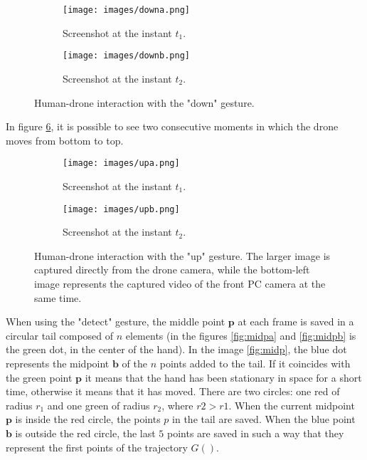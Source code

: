 \begin{figure}[H]
    \centering
    \begin{subfigure}[b]{0.49 \textwidth}
        \centering
        \texttt{[image: images/downa.png]}
        \caption[]{Screenshot at the instant $t_1$.}
        \label{fig:downa}
    \end{subfigure}
    \hfill
    \begin{subfigure}[b]{0.49 \textwidth}
        \centering
        \texttt{[image: images/downb.png]}
        \caption[]{Screenshot at the instant $t_2$.}
        \label{fig:downb}
    \end{subfigure}
    \caption[Human-drone interaction with the "down" gesture.]{Human-drone interaction with the "down" gesture.}
    \label{fig:down}
\end{figure}

\noindent In figure \ref{fig:up}, it is possible to see two consecutive moments in which the drone moves from bottom to top.

\begin{figure}[H]
    \centering
    \begin{subfigure}[b]{0.7 \textwidth}
        \centering
        \texttt{[image: images/upa.png]}
        \caption[]{Screenshot at the instant $t_1$.}
        \label{fig:upa}
    \end{subfigure}
    \hfill
    \begin{subfigure}[b]{0.7 \textwidth}
        \centering
        \texttt{[image: images/upb.png]}
        \caption[]{Screenshot at the instant $t_2$.}
        \label{fig:upb}
    \end{subfigure}
    \caption[Human-drone interaction with the "up" gesture.]{Human-drone interaction with the "up" gesture. The larger image is captured directly from the drone camera, while the bottom-left image represents the captured video of the front PC camera at the same time.}
    \label{fig:up}
\end{figure}

\noindent When using the "detect" gesture, the middle point $\bm{p}$ at each frame is saved in a circular tail composed of $n$ elements (in the figures \ref{fig:midpa} and \ref{fig:midpb} is the green dot, in the center of the hand). In the image \ref{fig:midp}, the blue dot represents the midpoint $\bm{b}$ of the $n$ points added to the tail. If it coincides with the green point $\bm{p}$ it means that the hand has been stationary in space for a short time, otherwise it means that it has moved. There are two circles: one red of radius $r_1$ and one green of radius $r_2$, where $r2>r1$. When the current midpoint $\bm{p}$ is inside the red circle, the points $p$ in the tail are saved. When the blue point $\bm{b}$ is outside the red circle, the last $5$ points are saved in such a way that they represent the first points of the trajectory $G()$.

